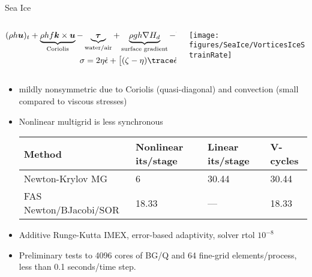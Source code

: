 \documentclass{beamer}
\begin{document}
\begin{frame}{Sea Ice}
  \begin{columns}
    \begin{column}{0.75\textwidth}
      {\scriptsize
        \begin{gather*}
          (\rho h \bm u)_t + \underbrace{\rho h f \bm k \times \bm u}_{\text{Coriolis}} - \underbrace{\bm \tau}_{\text{water/air}} + \underbrace{\rho g h \nabla H_d}_{\text{surface gradient}} - \nabla\cdot(\underbrace{\rho h \bm u \otimes \bm u}_{\text{convection}} - \underbrace{\sigma}_{\text{viscoplastic}}) = 0 \\
          \sigma = 2 \eta \dot\epsilon + \big[(\zeta - \eta) \trace\dot\epsilon - P/2 \big] \bm 1
        \end{gather*}}
    \end{column}
    \begin{column}{0.25\textwidth}
      \texttt{[image: figures/SeaIce/VorticesIceStrainRate]}      
    \end{column}
  \end{columns}
  \begin{itemize}
  \item mildly nonsymmetric due to Coriolis (quasi-diagonal) and convection (small compared to viscous stresses)
  \item Nonlinear multigrid is less synchronous
    {\small
    \begin{tabular}{llll}
      \toprule
      Method & Nonlinear its/stage & Linear its/stage & V-cycles \\
      \midrule
      Newton-Krylov MG & 6 & 30.44 & 30.44 \\
      FAS Newton/BJacobi/SOR & 18.33 & --- & 18.33 \\
      \bottomrule
    \end{tabular}}
  \item Additive Runge-Kutta IMEX, error-based adaptivity, solver rtol $10^{-8}$
  \item Preliminary tests to 4096 cores of BG/Q and 64 fine-grid elements/process, less than 0.1 seconds/time step.
  \end{itemize}
\end{frame}






\end{document}
